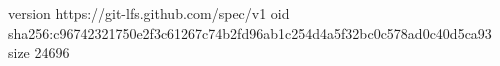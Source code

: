 version https://git-lfs.github.com/spec/v1
oid sha256:c96742321750e2f3c61267c74b2fd96ab1c254d4a5f32bc0c578ad0c40d5ca93
size 24696
